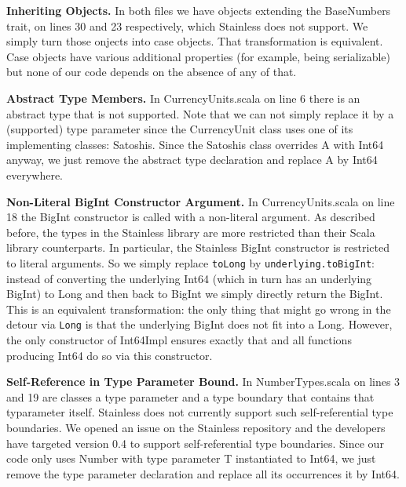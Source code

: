 \documentclass[runningheads]{llncs}
\renewcommand{\paragraph}{\textbf}%
\begin{document}
\paragraph{Inheriting Objects.} In both files we have objects
extending the BaseNumbers trait, on lines 30 and 23 respectively,
which Stainless does not support. We simply turn those onjects into
case objects. That transformation is equivalent. Case objects have
various additional properties (for example, being serializable) but
none of our code depends on the absence of any of that.

\paragraph{Abstract Type Members.} In CurrencyUnits.scala on line 6
there is an abstract type that is not supported. Note that we can not
simply replace it by a (supported) type parameter since the
CurrencyUnit class uses one of its implementing classes:
Satoshis. Since the Satoshis class overrides A with Int64 anyway, we
just remove the abstract type declaration and replace A by Int64
everywhere.

\paragraph{Non-Literal BigInt Constructor Argument.} In
CurrencyUnits.scala on line 18 the BigInt constructor is called with a
non-literal argument. As described before, the types in the Stainless
library are more restricted than their Scala library counterparts. In
particular, the Stainless BigInt constructor is restricted to literal
arguments. So we simply replace \texttt{toLong} by
\texttt{underlying.toBigInt}: instead of converting the underlying
Int64 (which in turn has an underlying BigInt) to Long and then back
to BigInt we simply directly return the BigInt. This is an equivalent
transformation: the only thing that might go wrong in the detour via
\texttt{Long} is that the underlying BigInt does not fit into a
Long. However, the only constructor of Int64Impl ensures exactly that
and all functions producing Int64 do so via this constructor.

\paragraph{Self-Reference in Type Parameter Bound.} In
NumberTypes.scala on lines 3 and 19 are classes a type parameter and a
type boundary that contains that typarameter itself. Stainless does
not currently support such self-referential type boundaries. We opened
an issue \cite{Stainless:issue519} on the Stainless repository and the
developers have targeted version 0.4 to support self-referential type
boundaries. Since our code only uses Number with type parameter T
instantiated to Int64, we just remove the type parameter declaration
and replace all its occurrences it by Int64.
\end{document}
